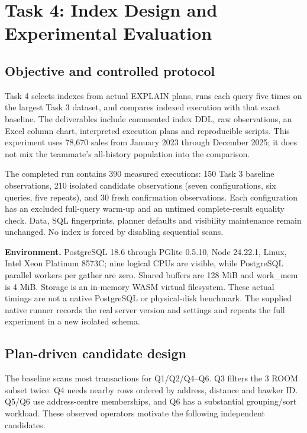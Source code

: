 \documentclass[11pt,a4paper]{article}
\begin{document}
\section{Task 4: Index Design and Experimental Evaluation}
\subsection{Objective and controlled protocol}
Task 4 selects indexes from actual EXPLAIN plans, runs each query five times on the largest Task 3 dataset, and compares indexed execution with that exact baseline. The deliverables include commented index DDL, raw observations, an Excel column chart, interpreted execution plans and reproducible scripts. This experiment uses 78,670 sales from January 2023 through December 2025; it does not mix the teammate's all-history population into the comparison.

The completed run contains 390 measured executions: 150 Task 3 baseline observations, 210 isolated candidate observations (seven configurations, six queries, five repeats), and 30 fresh confirmation observations. Each configuration has an excluded full-query warm-up and an untimed complete-result equality check. Data, SQL fingerprints, planner defaults and visibility maintenance remain unchanged. No index is forced by disabling sequential scans.

\textbf{Environment.} PostgreSQL 18.6 through PGlite 0.5.10, Node 24.22.1, Linux, Intel Xeon Platinum 8573C; nine logical CPUs are visible, while PostgreSQL parallel workers per gather are zero. Shared buffers are 128 MiB and work\_mem is 4 MiB. Storage is an in-memory WASM virtual filesystem. These actual timings are not a native PostgreSQL or physical-disk benchmark. The supplied native runner records the real server version and settings and repeats the full experiment in a new isolated schema.

\subsection{Plan-driven candidate design}
The baseline scans most transactions for Q1/Q2/Q4--Q6. Q3 filters the 3 ROOM subset twice. Q4 needs nearby rows ordered by address, distance and hawker ID. Q5/Q6 use address-centre memberships, and Q6 has a substantial grouping/sort workload. These observed operators motivate the following independent candidates.
\end{document}
